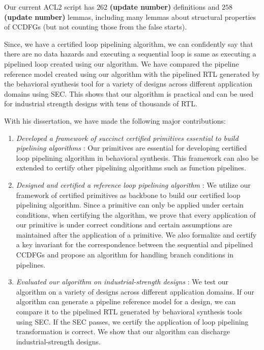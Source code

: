 Our current ACL2 script has $262$ {\textbf {(update number)}} definitions and $258$ {\textbf {(update number)}} lemmas, including many lemmas about structural properties of CCDFGs (but not counting those from the false starts). 

Since, we have a certified loop pipelining algorithm, we can confidently say that there are no data hazards and executing a sequential loop is same as executing a pipelined loop created using our algorithm. We have compared the pipeline reference model created using our algorithm with the pipelined RTL generated by the behavioral synthesis tool for a variety of designs across different application domains using SEC. This shows that our algorithm is practical and can be used for industrial strength designs with tens of thousands of RTL. 

With his dissertation, we have made the following major contributions:
\begin{enumerate}[--]
\item {\em Developed a framework of succinct certified primitives essential to build pipelining algorithms} : Our primitives are essential for developing certified loop pipelining algorithm in behavioral synthesis. This framework can also be extended to certify other pipelining algorithms such as function pipelines.
\item {\em Designed and certified a reference loop pipelining algorithm} : We utilize our framework of certified primitives as backbone to build our certified loop pipelining algorithm. Since a primitive can only be applied under certain conditions, when certifying the algorithm, we prove that every application of our primitive is under correct conditions and certain assumptions are maintained after the application of a primitive. We also formalize and certify a key invariant for the correspondence between the sequential and pipelined CCDFGs and propose an algorithm for handling branch conditions in pipelines.
\item {\em Evaluated our algorithm on industrial-strength designs} : We test our algorithm on a variety of designs across different application domains. If our algorithm can generate a pipeline reference model for a design, we can compare it to the pipelined RTL generated by behavioral synthesis tools using SEC. If the SEC passes, we certify the application of loop pipelining transformation is correct. We show that our algorithm can discharge industrial-strength designs.
\end{enumerate} 

